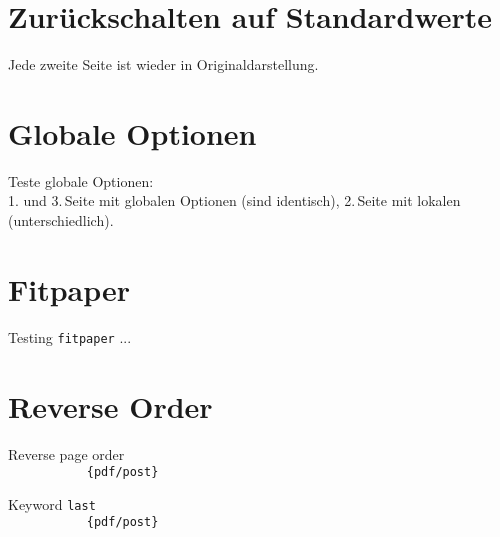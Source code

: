 \documentclass[a4paper,\myClassOptions]{article}
\begin{document}
\Huge




\begingroup
\section{Zur\"uckschalten auf Standardwerte}
Jede zweite Seite ist wieder in Originaldarstellung.











\endgroup

\begingroup
\section{Globale Optionen}
Teste globale Optionen:\\
1. und 3.\,Seite mit globalen Optionen (sind identisch),
2.\,Seite mit lokalen (unterschiedlich).




\endgroup


\section{Fitpaper}
\begingroup
Testing \texttt{fitpaper} ...

\endgroup


\section{Reverse Order}
\begingroup
Reverse page order\\
\verb||
\verb|           {pdf/post}|

Keyword \verb|last|\\
\verb||
\verb|           {pdf/post}|

\endgroup
\end{document}
